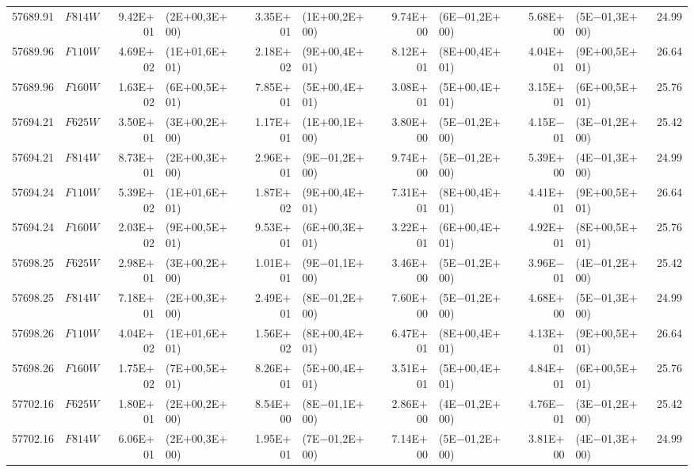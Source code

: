 \begin{tabular}{r c r @{\hspace{0.5em}} l r @{\hspace{0.5em}} l r @{\hspace{0.5em}} l r @{\hspace{0.5em}} l r}
57689.91 & $F814W$ & 9.42E$+$01 & (2E$+$00,3E$+$00) & 3.35E$+$01 & (1E$+$00,2E$+$00) & 9.74E$+$00 & (6E$-$01,2E$+$00) & 5.68E$+$00 & (5E$-$01,3E$+$00) & 24.99\\
57689.96 & $F110W$ & 4.69E$+$02 & (1E$+$01,6E$+$01) & 2.18E$+$02 & (9E$+$00,4E$+$01) & 8.12E$+$01 & (8E$+$00,4E$+$01) & 4.04E$+$01 & (9E$+$00,5E$+$01) & 26.64\\
57689.96 & $F160W$ & 1.63E$+$02 & (6E$+$00,5E$+$01) & 7.85E$+$01 & (5E$+$00,4E$+$01) & 3.08E$+$01 & (5E$+$00,4E$+$01) & 3.15E$+$01 & (6E$+$00,5E$+$01) & 25.76\\
57694.21 & $F625W$ & 3.50E$+$01 & (3E$+$00,2E$+$00) & 1.17E$+$01 & (1E$+$00,1E$+$00) & 3.80E$+$00 & (5E$-$01,2E$+$00) & 4.15E$-$01 & (3E$-$01,2E$+$00) & 25.42\\
57694.21 & $F814W$ & 8.73E$+$01 & (2E$+$00,3E$+$00) & 2.96E$+$01 & (9E$-$01,2E$+$00) & 9.74E$+$00 & (5E$-$01,2E$+$00) & 5.39E$+$00 & (4E$-$01,3E$+$00) & 24.99\\
57694.24 & $F110W$ & 5.39E$+$02 & (1E$+$01,6E$+$01) & 1.87E$+$02 & (9E$+$00,4E$+$01) & 7.31E$+$01 & (8E$+$00,4E$+$01) & 4.41E$+$01 & (9E$+$00,5E$+$01) & 26.64\\
57694.24 & $F160W$ & 2.03E$+$02 & (9E$+$00,5E$+$01) & 9.53E$+$01 & (6E$+$00,3E$+$01) & 3.22E$+$01 & (6E$+$00,4E$+$01) & 4.92E$+$01 & (8E$+$00,5E$+$01) & 25.76\\
57698.25 & $F625W$ & 2.98E$+$01 & (3E$+$00,2E$+$00) & 1.01E$+$01 & (9E$-$01,1E$+$00) & 3.46E$+$00 & (5E$-$01,2E$+$00) & 3.96E$-$01 & (4E$-$01,2E$+$00) & 25.42\\
57698.25 & $F814W$ & 7.18E$+$01 & (2E$+$00,3E$+$00) & 2.49E$+$01 & (8E$-$01,2E$+$00) & 7.60E$+$00 & (5E$-$01,2E$+$00) & 4.68E$+$00 & (5E$-$01,3E$+$00) & 24.99\\
57698.26 & $F110W$ & 4.04E$+$02 & (1E$+$01,6E$+$01) & 1.56E$+$02 & (8E$+$00,4E$+$01) & 6.47E$+$01 & (8E$+$00,4E$+$01) & 4.13E$+$01 & (9E$+$00,5E$+$01) & 26.64\\
57698.26 & $F160W$ & 1.75E$+$02 & (7E$+$00,5E$+$01) & 8.26E$+$01 & (5E$+$00,4E$+$01) & 3.51E$+$01 & (5E$+$00,4E$+$01) & 4.84E$+$01 & (6E$+$00,5E$+$01) & 25.76\\
57702.16 & $F625W$ & 1.80E$+$01 & (2E$+$00,2E$+$00) & 8.54E$+$00 & (8E$-$01,1E$+$00) & 2.86E$+$00 & (4E$-$01,2E$+$00) & 4.76E$-$01 & (3E$-$01,2E$+$00) & 25.42\\
57702.16 & $F814W$ & 6.06E$+$01 & (2E$+$00,3E$+$00) & 1.95E$+$01 & (7E$-$01,2E$+$00) & 7.14E$+$00 & (5E$-$01,2E$+$00) & 3.81E$+$00 & (4E$-$01,3E$+$00) & 24.99\\

\end{tabular}
